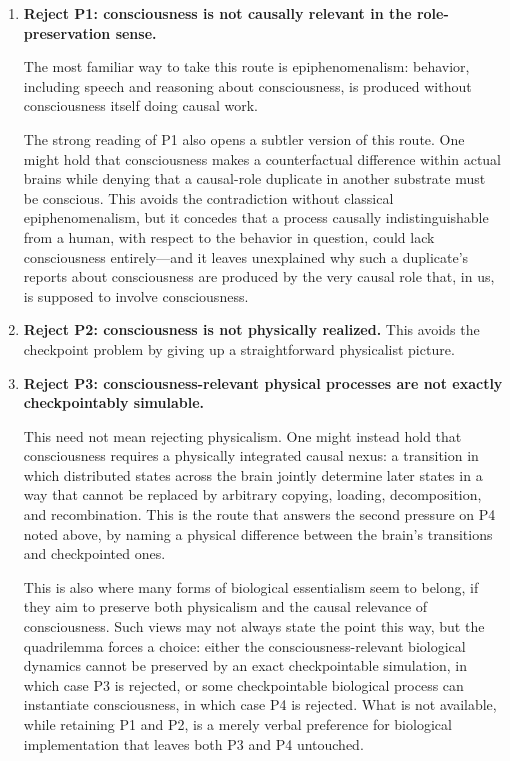 \documentclass[11pt]{article}
\begin{document}
\begin{enumerate}[label=\textbf{\arabic*.}]
  \item \textbf{Reject P1: consciousness is not causally relevant in the
          role-preservation sense.}

        The most familiar way to take this route is epiphenomenalism: behavior,
        including speech and reasoning about consciousness, is produced without
        consciousness itself doing causal work.

        The strong reading of P1 also opens a subtler version of this route.
        One might hold that consciousness makes a counterfactual difference
        within actual brains while denying that a causal-role duplicate in
        another substrate must be conscious. This avoids the contradiction
        without classical epiphenomenalism, but it concedes that a process
        causally indistinguishable from a human, with respect to the behavior
        in question, could lack consciousness entirely---and it leaves
        unexplained why such a duplicate's reports about consciousness are
        produced by the very causal role that, in us, is supposed to involve
        consciousness.

  \item \textbf{Reject P2: consciousness is not physically realized.}
        This avoids the checkpoint problem by giving up a straightforward
        physicalist picture.

  \item \textbf{Reject P3: consciousness-relevant physical processes are not
          exactly checkpointably simulable.}

        This need not mean rejecting physicalism. One might instead hold that
        consciousness requires a physically integrated causal nexus: a
        transition in which distributed states across the brain jointly
        determine later states in a way that cannot be replaced by arbitrary
        copying, loading, decomposition, and recombination. This is the route
        that answers the second pressure on P4 noted above, by naming a
        physical difference between the brain's transitions and checkpointed
        ones.

        This is also where many forms of biological essentialism seem to
        belong, if they aim to preserve both physicalism and the causal
        relevance of consciousness. Such views may not always state the point
        this way, but the quadrilemma forces a choice: either the
        consciousness-relevant biological dynamics cannot be preserved by an
        exact checkpointable simulation, in which case P3 is rejected, or some
        checkpointable biological process can instantiate consciousness, in
        which case P4 is rejected. What is not available, while retaining P1
        and P2, is a merely verbal preference for biological implementation
        that leaves both P3 and P4 untouched.


\end{enumerate}
\end{document}
